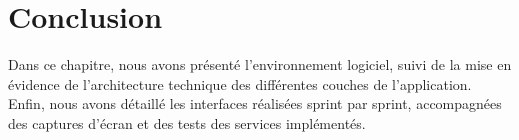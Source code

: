 \section*{Conclusion}
Dans ce chapitre, nous avons présenté l'environnement logiciel, suivi de la mise en évidence de l'architecture technique des différentes couches de l'application. Enfin, nous avons détaillé les interfaces réalisées sprint par sprint, accompagnées des captures d'écran et des tests des services implémentés.